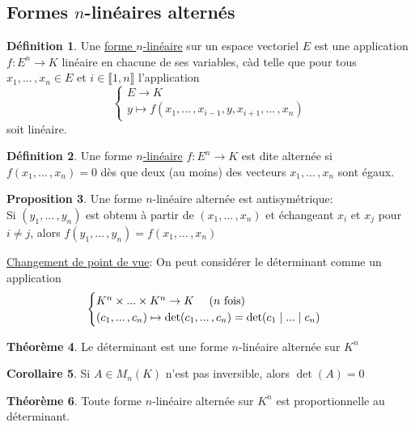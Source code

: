 \documentclass[10pt,a4paper]{article}
\theoremstyle{definition}
\newtheorem{proposition}{Proposition}[section]
\newtheorem{theorem}[proposition]{Théorème}
\newtheorem{corollaire}[proposition]{Corollaire}
\newtheorem{definition}[proposition]{Définition}
\begin{document}
\subsection{Formes $n$-linéaires alternés}
\begin{definition}
Une \uline{forme $n$-linéaire} sur un espace vectoriel $E$ est une application $f: E^n \to K$ linéaire en chacune de ses variables, càd telle que pour tous $x_1, ...\,, x_n \in E$ et $i \in \llbracket 1, n \rrbracket$ l'application 
\[\begin{cases}
E \to K \\
y \mapsto f(x_1, ...\,, x_{i - 1}, y, x_{i + 1}, ...\,, x_n)
\end{cases}\]
soit linéaire.
\end{definition}
\begin{definition}
Une forme \uline{$n$-linéaire} $f: E^n \to K$ est dite alternée si $f(x_1, ...\,, x_n) = 0$ dès que deux (au moins) des vecteurs $x_1, ...\,, x_n$ sont égaux.
\end{definition}
\begin{proposition}
Une forme $n$-linéaire alternée est antisymétrique: \\
Si $(y_1, ...\,, y_n)$ est obtenu à partir de $(x_1, ...\,, x_n)$ et échangeant $x_i$ et $x_j$ pour $i \neq j$, alors $f(y_1, ...\,, y_n) = f(x_1, ...\,, x_n)$
\end{proposition}
\noindent \uline{Changement de point de vue}: On peut considérer le déterminant comme un application
\[ \begin{cases}
K^n \times ... \times K^n \to K \text{ \quad ($n$ fois) } \\
(c_1, ...\,, c_n) \mapsto \det(c_1, ...\,, c_n) = \det(c_1 \mid ... \mid c_n)
\end{cases}\]
\begin{theorem}
Le déterminant est une forme $n$-linéaire alternée sur $K^n$
\end{theorem}
\begin{corollaire}
Si $A \in M_n(K)$ n'est pas inversible, alors $\det(A) = 0$
\end{corollaire}
\begin{theorem}
Toute forme $n$-linéaire alternée sur $K^n$ est proportionnelle au déterminant.
\end{theorem}
\end{document}
